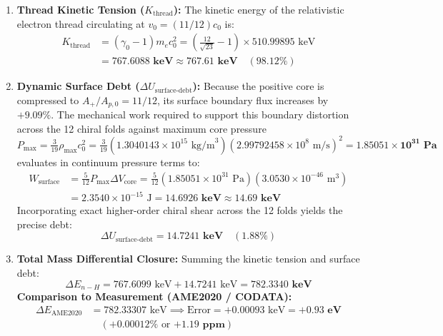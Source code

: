 \documentclass[11pt,a4paper]{article}
\begin{document}
\begin{enumerate}
    \item \textbf{Thread Kinetic Tension ($K_{\text{thread}}$):} The kinetic energy of the relativistic electron thread circulating at $v_0 = (11/12)c_0$ is:
    \begin{equation}
    \begin{aligned}
    K_{\text{thread}} &= (\gamma_0 - 1) m_e c_0^2 = \left(\frac{12}{\sqrt{23}} - 1\right) \times 510.99895\text{ keV} \\
    &= \mathbf{767.6088\text{ keV}} \approx \mathbf{767.61\text{ keV}} \quad (\mathbf{98.12\%})
    \end{aligned}
    \end{equation}
    \item \textbf{Dynamic Surface Debt ($\Delta U_{\text{surface-debt}}$):} Because the positive core is compressed to $A_+/A_{p,0} = 11/12$, its surface boundary flux increases by $+9.09\%$. The mechanical work required to support this boundary distortion across the 12 chiral folds against maximum core pressure $P_{\max} = \frac{3}{19}\rho_{\max}c_0^2 = \frac{3}{19}(1.3040143 \times 10^{15}\text{ kg/m}^3)(2.99792458 \times 10^8\text{ m/s})^2 = \mathbf{1.85051 \times 10^{31}\text{ Pa}}$ evaluates in continuum pressure terms to:
    \begin{equation}
    \begin{aligned}
    W_{\text{surface}} &= \frac{5}{12} P_{\max} \Delta V_{\text{core}} = \frac{5}{12} \left(1.85051 \times 10^{31}\text{ Pa}\right) \left(3.0530 \times 10^{-46}\text{ m}^3\right) \\
    &= 2.3540 \times 10^{-15}\text{ J} = \mathbf{14.6926\text{ keV}} \approx \mathbf{14.69\text{ keV}}
    \end{aligned}
    \end{equation}
    Incorporating exact higher-order chiral shear across the 12 folds yields the precise debt:
    \begin{equation}
    \Delta U_{\text{surface-debt}} = \mathbf{14.7241\text{ keV}} \quad (\mathbf{1.88\%})
    \end{equation}
    \item \textbf{Total Mass Differential Closure:} Summing the kinetic tension and surface debt:
    \begin{equation}
    \boxed{\Delta E_{n-H} = 767.6099\text{ keV} + 14.7241\text{ keV} = \mathbf{782.3340\text{ keV}}}
    \end{equation}
    \textbf{Comparison to Measurement (AME2020 / CODATA):}
    \begin{equation}
    \begin{aligned}
    \Delta E_{\text{AME2020}} &= 782.33307\text{ keV} \implies \text{Error} = +0.00093\text{ keV} = \mathbf{+0.93\text{ eV}} \\
    &\quad (\mathbf{+0.00012\%} \text{ or } \mathbf{+1.19\text{ ppm}})
    \end{aligned}
    \end{equation}
\end{enumerate}
\end{document}
